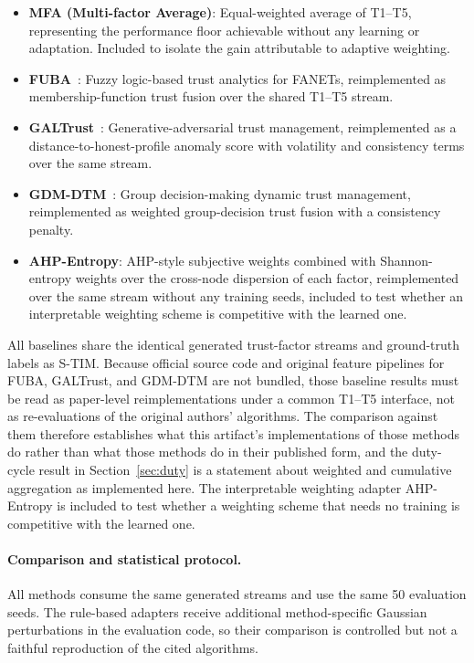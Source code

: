 \documentclass[notspecified,article,submit,moreauthors]{Definitions/mdpi}
\begin{document}
\begin{itemize}[topsep=0pt,itemsep=2pt]
    \item \textbf{MFA (Multi-factor Average)}: Equal-weighted average of T1--T5, representing the performance floor achievable without any learning or adaptation. Included to isolate the gain attributable to adaptive weighting.
    \item \textbf{FUBA}~\cite{benfriha2024fuba}: Fuzzy logic-based trust analytics for FANETs, reimplemented as membership-function trust fusion over the shared T1--T5 stream.
    \item \textbf{GALTrust}~\cite{akram2024galtrust}: Generative-adversarial trust management, reimplemented as a distance-to-honest-profile anomaly score with volatility and consistency terms over the same stream.
    \item \textbf{GDM-DTM}~\cite{hu2025gdm}: Group decision-making dynamic trust management, reimplemented as weighted group-decision trust fusion with a consistency penalty.
    \item \textbf{AHP-Entropy}: AHP-style subjective weights combined with Shannon-entropy weights over the cross-node dispersion of each factor, reimplemented over the same stream without any training seeds, included to test whether an interpretable weighting scheme is competitive with the learned one.
\end{itemize}

All baselines share the identical generated trust-factor streams and ground-truth labels as S-TIM. Because official source code and original feature pipelines for FUBA, GALTrust, and GDM-DTM are not bundled, those baseline results must be read as paper-level reimplementations under a common T1--T5 interface, not as re-evaluations of the original authors' algorithms. The comparison against them therefore establishes what this artifact's implementations of those methods do rather than what those methods do in their published form, and the duty-cycle result in Section~\ref{sec:duty} is a statement about weighted and cumulative aggregation as implemented here. The interpretable weighting adapter AHP-Entropy is included to test whether a weighting scheme that needs no training is competitive with the learned one.

\paragraph{Comparison and statistical protocol.}
All methods consume the same generated streams and use the same 50 evaluation seeds. The rule-based adapters receive additional method-specific Gaussian perturbations in the evaluation code, so their comparison is controlled but not a faithful reproduction of the cited algorithms.
\end{document}
